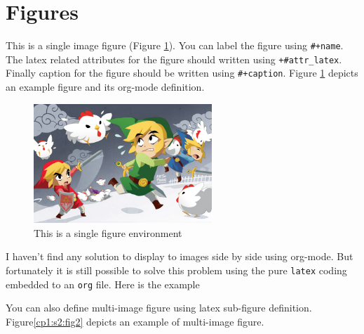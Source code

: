 \documentclass[12pt]{report}
\numberwithin{equation}{section}
\begin{document}
\section{Figures}
\label{cp1:s2}
This is a single image figure (Figure \ref{cp1:s2:fig1}). You can label the figure
using \texttt{\#+name}. The latex related attributes for the figure should written using
\texttt{+\#attr\_latex}. Finally caption for the figure should be written using
\texttt{\#+caption}. Figure \ref{cp1:s2:fig1} depicts an example figure and its org-mode
definition.

\begin{figure}[!ht]
\centering
\includegraphics[width=0.6\textwidth]{./figures/Sample/tumblr_static_eaceks0rfxsss8o4swscw40wo.jpg}
\caption{\label{cp1:s2:fig1}This is a single figure environment}
\end{figure}


I haven't find any solution to display to images side by side using org-mode.
But fortunately it is still possible to solve this problem using the pure \texttt{latex}
coding embedded to an \texttt{org} file. Here is the example

You can also define multi-image figure using latex sub-figure definition.
Figure\ref{cp1:s2:fig2} depicts an example of multi-image figure.
\end{document}
